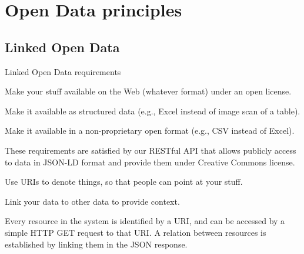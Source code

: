 \section[Open Data principles]{Open Data principles}

\subsection[Linked Open Data]{Linked Open Data}

\begin{frame}[allowframebreaks]{Linked Open Data\autocite{Berners-Lee_2006} requirements}
	\begin{block}{\faStar\faStarO\faStarO\faStarO\faStarO}
		Make your stuff available on the Web (whatever format) under an open
		license.
	\end{block}
	\vspace*{-8pt}
	\begin{block}{\faStar\faStar\faStarO\faStarO\faStarO}
		Make it available as structured data (e.g., Excel instead of image scan
		of a table).
	\end{block}
	\vspace*{-8pt}
	\begin{block}{\faStar\faStar\faStar\faStarO\faStarO}
		Make it available in a non-proprietary open format (e.g., CSV instead of
		Excel).
	\end{block}
	These requirements are satisfied by our RESTful API that allows
	publicly access to data in JSON-LD\autocite{Sporny_2014} format and provide
	them under Creative Commons license.

	\framebreak

	\begin{block}{\faStar\faStar\faStar\faStar\faStarO}
		Use URIs to denote things, so that people can point at your stuff.
	\end{block}
	\vspace*{-8pt}
	\begin{block}{\faStar\faStar\faStar\faStar\faStar}
		Link your data to other data to provide context.
	\end{block}
	Every resource in the system is identified by a URI, and can be accessed
	by a simple HTTP GET request to that URI. A relation between resources
	is established by linking them in the JSON response.
\end{frame}

